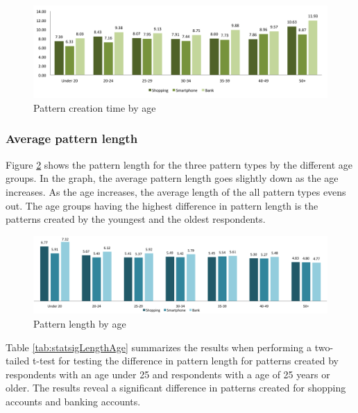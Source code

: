     \begin{figure}[H]
      \centering
      \includegraphics[width=\textwidth]{pics/analysis/creationtime-age.png}
      \caption{Pattern creation time by age}
      \label{fig:patterncreationtimeage}
    \end{figure}

    \clearpage
    \subsubsection{Average pattern length}
    Figure \ref{fig:patternlengthage} shows the pattern length for the three pattern types by the different age groups. In the graph, the average pattern length goes slightly down as the age increases. As the age increases, the average length of the all pattern types evens out. The age groups having the highest difference in pattern length is the patterns created by the youngest and the oldest respondents. 

  	\begin{figure}[H]
	    \centering
	    \includegraphics[width=\textwidth]{pics/analysis/avgpatternlength-age.png}
	    \caption{Pattern length by age}
	    \label{fig:patternlengthage}
  	\end{figure}

    Table \ref{tab:statsigLengthAge} summarizes the results when performing a two-tailed t-test for testing the difference in pattern length for patterns created by respondents with an age under 25 and respondents with a age of 25 years or older. The results reveal a significant difference in patterns created for shopping accounts and banking accounts. 

